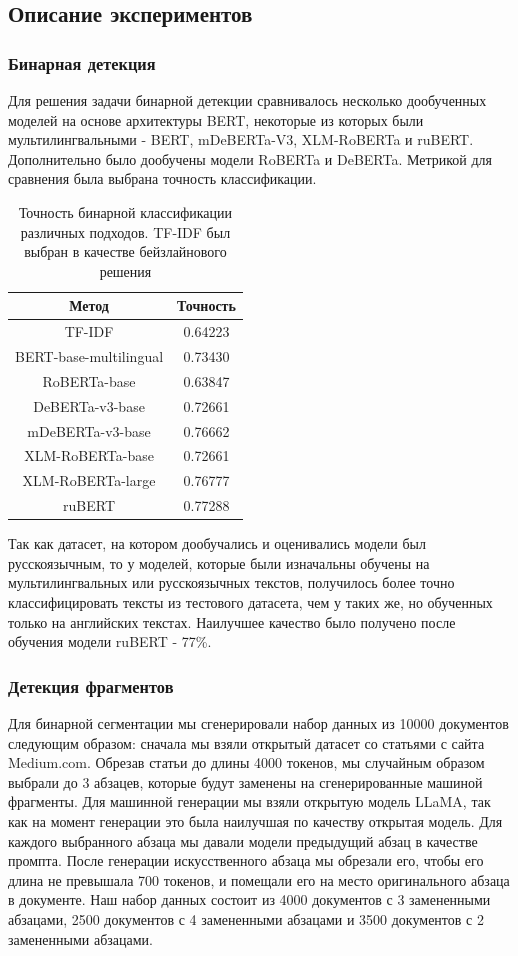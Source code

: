 \subsection{Описание экспериментов}

\subsubsection{Бинарная детекция}
Для решения задачи бинарной детекции сравнивалось несколько дообученных моделей на основе архитектуры BERT, некоторые из которых были мультилингвальными -  BERT,  mDeBERTa-V3, XLM-RoBERTa и ruBERT. Дополнительно было дообучены модели RoBERTa и DeBERTa.
Метрикой для сравнения была выбрана точность классификации.

\begin{table}[h!]
\centering
\begin{tabular}{|c |c |}
\hline
\textbf{Метод} & \textbf{Точность} \\
\hline
TF-IDF & 0.64223 \\
BERT-base-multilingual & 0.73430 \\
RoBERTa-base & 0.63847 \\
DeBERTa-v3-base  & 0.72661 \\
mDeBERTa-v3-base  &  0.76662 \\
XLM-RoBERTa-base & 0.72661  \\
XLM-RoBERTa-large &  0.76777 \\
ruBERT & 0.77288 \\
\hline
\end{tabular}
\caption{Точность бинарной классификации различных подходов. TF-IDF был выбран в качестве бейзлайнового решения} 
\label{tab:mae}
\end{table}

Так как датасет, на котором дообучались и оценивались модели был русскоязычным, то у моделей, которые были изначальны обучены на мультилингвальных или русскоязычных текстов, получилось более точно классифицировать тексты из тестового датасета, чем у таких же, но обученных только на английских текстах. Наилучшее качество было получено после обучения модели ruBERT - 77\%.

\subsubsection{Детекция фрагментов}
\label{paragraphwise_split}
Для бинарной сегментации мы сгенерировали набор данных из 10000 документов следующим образом: сначала мы взяли открытый датасет  со статьями с сайта Medium.com. Обрезав статьи до длины 4000 токенов, мы случайным образом выбрали до 3 абзацев, которые будут заменены на сгенерированные машиной фрагменты. Для машинной генерации мы взяли открытую модель LLaMA, так как на момент генерации это была наилучшая по качеству открытая модель. Для каждого выбранного абзаца мы давали модели предыдущий абзац в качестве промпта. 
После генерации искусственного абзаца мы обрезали его, чтобы его длина не превышала 700 токенов, и помещали его на место оригинального абзаца в документе. Наш набор данных состоит из 4000 документов с 3 замененными абзацами, 2500 документов с 4 замененными абзацами и 3500 документов с 2 замененными абзацами.

